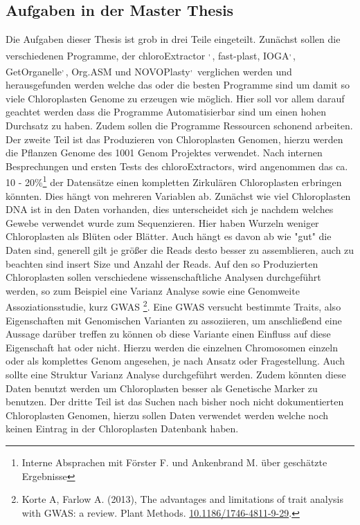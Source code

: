 \documentclass{scrartcl}
\begin{document}
\subsection{Aufgaben in der Master Thesis}
\label{sec-2-7}
Die Aufgaben dieser Thesis ist grob in drei Teile eingeteilt. Zunächst sollen die verschiedenen Programme, der chloroExtractor \footnotemark[16]{}\textsuperscript{,}\,\footnotemark[17]{}, fast-plast\footnotemark[23]{}, IOGA\footnotemark[32]{}\textsuperscript{,}\,\footnotemark[33]{}, GetOrganelle\footnotemark[29]{}\textsuperscript{,}\,\footnotemark[30]{},
Org.ASM \footnotemark[26]{}und NOVOPlasty\footnotemark[24]{}\textsuperscript{,}\,\footnotemark[25]{} verglichen werden und herausgefunden werden welche das oder die besten Programme sind um damit so viele Chloroplasten Genome zu erzeugen wie 
möglich. Hier soll vor allem darauf geachtet werden dass die Programme Automatisierbar sind um einen hohen Durchsatz zu haben. Zudem sollen die Programme Ressourcen schonend arbeiten. 
Der zweite Teil ist das Produzieren von Chloroplasten Genomen, hierzu werden die Pflanzen Genome des 1001 Genom Projektes verwendet. Nach internen Besprechungen und ersten Tests des chloroExtractors,
wird angenommen das ca. 10 - 20\%\footnote{Interne Absprachen mit Förster F. und Ankenbrand M. über geschätzte Ergebnisse
\clearpage} der Datensätze einen kompletten Zirkulären Chloroplasten erbringen könnten. Dies hängt von mehreren Variablen ab. Zunächst wie viel Chloroplasten DNA ist in den Daten vorhanden, dies
unterscheidet sich je nachdem welches Gewebe verwendet wurde zum Sequenzieren. Hier haben Wurzeln weniger Chloroplasten als Blüten oder Blätter. Auch hängt es davon ab wie "gut" die Daten sind, generell gilt je 
größer die Reads desto besser zu assemblieren, auch zu beachten sind insert Size und Anzahl der Reads.
Auf den so Produzierten Chloroplasten sollen verschiedene wissenschaftliche Analysen durchgeführt werden, so zum Beispiel eine Varianz Analyse sowie eine Genomweite Assoziationsstudie, kurz GWAS \footnote{Korte A, Farlow A. (2013), The advantages and limitations of trait analysis with GWAS: a review. Plant Methods. \url{10.1186/1746-4811-9-29}.}.
Eine GWAS versucht bestimmte Traits, also Eigenschaften mit Genomischen Varianten zu assoziieren, um anschließend eine Aussage darüber treffen zu können ob diese Variante einen Einfluss auf diese 
Eigenschaft hat oder nicht. Hierzu werden die einzelnen Chromosomen einzeln oder als komplettes Genom angesehen, je nach Ansatz oder Fragestellung.
Auch sollte eine Struktur Varianz Analyse durchgeführt werden. Zudem könnten diese Daten benutzt werden um Chloroplasten besser als Genetische Marker zu benutzen. 
Der dritte Teil ist das Suchen nach bisher noch nicht dokumentierten Chloroplasten Genomen, hierzu sollen Daten verwendet werden welche noch keinen Eintrag in der Chloroplasten Datenbank haben.
\end{document}
